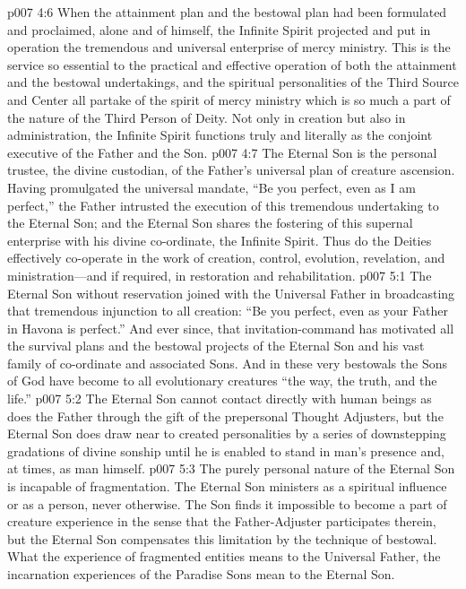 \pc \vs p007 4:6 \bibnobreakspace {} When the attainment plan and the bestowal plan had been formulated and proclaimed, alone and of himself, the Infinite Spirit projected and put in operation the tremendous and universal enterprise of mercy ministry. This is the service so essential to the practical and effective operation of both the attainment and the bestowal undertakings, and the spiritual personalities of the Third Source and Center all partake of the spirit of mercy ministry which is so much a part of the nature of the Third Person of Deity. Not only in creation but also in administration, the Infinite Spirit functions truly and literally as the conjoint executive of the Father and the Son.
\pc \vs p007 4:7 The Eternal Son is the personal trustee, the divine custodian, of the Father’s universal plan of creature ascension. Having promulgated the universal mandate, “Be you perfect, even as I am perfect,” the Father intrusted the execution of this tremendous undertaking to the Eternal Son; and the Eternal Son shares the fostering of this supernal enterprise with his divine co\hyp{}ordinate, the Infinite Spirit. Thus do the Deities effectively co\hyp{}operate in the work of creation, control, evolution, revelation, and ministration---and if required, in restoration and rehabilitation.\plusone
{}
\vs p007 5:1 The Eternal Son without reservation joined with the Universal Father in broadcasting that tremendous injunction to all creation: “Be you perfect, even as your Father in Havona is perfect.” And ever since, that invitation\hyp{}command has motivated all the survival plans and the bestowal projects of the Eternal Son and his vast family of co\hyp{}ordinate and associated Sons. And in these very bestowals the Sons of God have become to all evolutionary creatures “the way, the truth, and the life.”
\pc \vs p007 5:2 The Eternal Son cannot contact directly with human beings as does the Father through the gift of the prepersonal Thought Adjusters, but the Eternal Son does draw near to created personalities by a series of downstepping gradations of divine sonship until he is enabled to stand in man’s presence and, at times, as man himself.
\vs p007 5:3 The purely personal nature of the Eternal Son is incapable of fragmentation. The Eternal Son ministers as a spiritual influence or as a person, never otherwise. The Son finds it impossible to become a part of creature experience in the sense that the Father\hyp{}Adjuster participates therein, but the Eternal Son compensates this limitation by the technique of bestowal. What the experience of fragmented entities means to the Universal Father, the incarnation experiences of the Paradise Sons mean to the Eternal Son.

